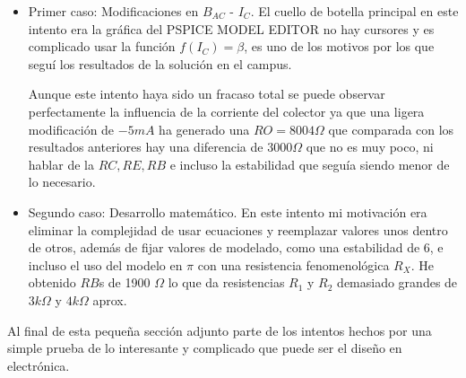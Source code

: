 \begin{itemize}
\item Primer caso: Modificaciones en $B_{AC}$ - $I_C$.
  El cuello de botella principal en este intento era la gráfica del
  PSPICE MODEL EDITOR no hay cursores y es complicado usar la función
  $f(I_C) = \beta$, es uno de los motivos por los que seguí los
  resultados de la solución en el campus.

  Aunque este intento haya sido un fracaso total se puede observar
  perfectamente la influencia de la corriente del colector ya que una
  ligera modificación de $-5 mA$ ha generado una $RO = 8004 \Omega$
  que comparada con los resultados anteriores hay una diferencia de
  $3000 \Omega$ que no es muy poco, ni hablar de la $RC,RE,RB$ e
  incluso la estabilidad que seguía siendo menor de lo necesario.


\item Segundo caso: Desarrollo matemático.
  En este intento mi motivación era eliminar la complejidad de usar
  ecuaciones y reemplazar valores unos dentro de otros, además de
  fijar valores de modelado, como una estabilidad de 6, e incluso el
  uso del modelo en $\pi$ con una resistencia fenomenológica $R_X$. He
  obtenido $RB$s de 1900 $\Omega$ lo que da resistencias $R_1$ y $R_2$
  demasiado grandes de $3k\Omega$ y $4k\Omega$ aprox.
\end{itemize}

  Al final de esta pequeña sección adjunto parte de los intentos
  hechos por una simple prueba de lo interesante y complicado que puede ser el
  diseño en electrónica.

